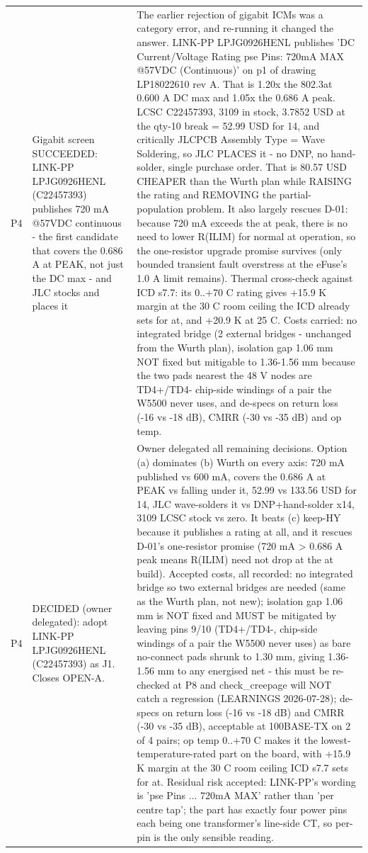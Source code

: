 \documentclass[11pt,a4paper]{article}
\begin{document}
{\begin{longtable}{lp{5.2cm}p{7.2cm}}
P4 & Gigabit screen SUCCEEDED: LINK-PP LPJG0926HENL (C22457393) publishes 720 mA @57VDC continuous - the first candidate that covers the 0.686 A at PEAK, not just the DC max - and JLC stocks and places it & The earlier rejection of gigabit ICMs was a category error, and re-running it changed the answer. LINK-PP LPJG0926HENL publishes 'DC Current/Voltage Rating pse Pins: 720mA MAX @57VDC (Continuous)' on p1 of drawing LP18022610 rev A. That is 1.20x the 802.3at 0.600 A DC max and 1.05x the 0.686 A peak. LCSC C22457393, 3109 in stock, 3.7852 USD at the qty-10 break = 52.99 USD for 14, and critically JLCPCB Assembly Type = Wave Soldering, so JLC PLACES it - no DNP, no hand-solder, single purchase order. That is 80.57 USD CHEAPER than the Wurth plan while RAISING the rating and REMOVING the partial-population problem. It also largely rescues D-01: because 720 mA exceeds the at peak, there is no need to lower R(ILIM) for normal at operation, so the one-resistor upgrade promise survives (only bounded transient fault overstress at the eFuse's 1.0 A limit remains). Thermal cross-check against ICD s7.7: its 0..+70 C rating gives +15.9 K margin at the 30 C room ceiling the ICD already sets for at, and +20.9 K at 25 C. Costs carried: no integrated bridge (2 external bridges - unchanged from the Wurth plan), isolation gap 1.06 mm NOT fixed but mitigable to 1.36-1.56 mm because the two pads nearest the 48 V nodes are TD4+/TD4- chip-side windings of a pair the W5500 never uses, and de-specs on return loss (-16 vs -18 dB), CMRR (-30 vs -35 dB) and op temp. \\
P4 & DECIDED (owner delegated): adopt LINK-PP LPJG0926HENL (C22457393) as J1. Closes OPEN-A. & Owner delegated all remaining decisions. Option (a) dominates (b) Wurth on every axis: 720 mA published vs 600 mA, covers the 0.686 A at PEAK vs falling under it, 52.99 vs 133.56 USD for 14, JLC wave-solders it vs DNP+hand-solder x14, 3109 LCSC stock vs zero. It beats (c) keep-HY because it publishes a rating at all, and it rescues D-01's one-resistor promise (720 mA \textgreater{} 0.686 A peak means R(ILIM) need not drop at the at build). Accepted costs, all recorded: no integrated bridge so two external bridges are needed (same as the Wurth plan, not new); isolation gap 1.06 mm is NOT fixed and MUST be mitigated by leaving pins 9/10 (TD4+/TD4-, chip-side windings of a pair the W5500 never uses) as bare no-connect pads shrunk to 1.30 mm, giving 1.36-1.56 mm to any energised net - this must be re-checked at P8 and check\_creepage will NOT catch a regression (LEARNINGS 2026-07-28); de-specs on return loss (-16 vs -18 dB) and CMRR (-30 vs -35 dB), acceptable at 100BASE-TX on 2 of 4 pairs; op temp 0..+70 C makes it the lowest-temperature-rated part on the board, with +15.9 K margin at the 30 C room ceiling ICD s7.7 sets for at. Residual risk accepted: LINK-PP's wording is 'pse Pins ... 720mA MAX' rather than 'per centre tap'; the part has exactly four power pins each being one transformer's line-side CT, so per-pin is the only sensible reading. \\

\end{longtable}}
\end{document}
